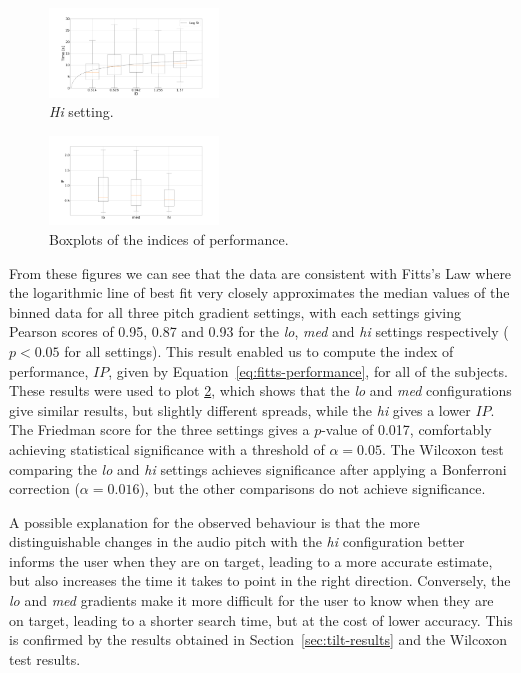 \documentclass[sigconf, review=true, screen=true, anonymous=true]{acmart}
\begin{document}
\begin{figure}
  \centering
  \includegraphics[clip, trim=120 20 120 20, width=0.4\textwidth]{figures/fitts_hi.png}
  \caption{\emph{Hi} setting. }
  \label{fig:fitts-hi}
\end{figure}

\begin{figure}
  \centering
  \includegraphics[clip, trim=90 20 130 20, width=0.4\textwidth]{figures/fitts_performance.png}
  \caption{Boxplots of the indices of performance.}
  \label{fig:fitts-performance}
\end{figure}

From these figures we can see that the data are consistent with Fitts's Law where the logarithmic line of best fit very closely approximates the median values of the binned data for all three pitch gradient settings, with each settings giving Pearson scores of 0.95, 0.87 and 0.93 for the \emph{lo}, \emph{med} and \emph{hi} settings respectively ($p < 0.05$ for all settings). 
This result enabled us to compute the index of performance, $IP$, given by Equation~\ref{eq:fitts-performance}, for all of the subjects.
These results were used to plot \cref{fig:fitts-performance}, which shows that the \emph{lo} and \emph{med} configurations give similar results, but slightly different spreads, while the \emph{hi} gives a lower $IP$.
The Friedman score for the three settings gives a $p$-value of 0.017, comfortably achieving statistical significance with a threshold of $\alpha=0.05$.
The Wilcoxon test comparing the \emph{lo} and \emph{hi} settings achieves significance after applying a Bonferroni correction ($\alpha=0.016$), but the other comparisons do not achieve significance. 

A possible explanation for the observed behaviour is that the more distinguishable changes in the audio pitch with the \emph{hi} configuration better informs the user when they are on target, leading to a more accurate estimate, but also increases the time it takes to point in the right direction.
Conversely, the \emph{lo} and \emph{med} gradients make it more difficult for the user to know when they are on target, leading to a shorter search time, but at the cost of lower accuracy.
This is confirmed by the results obtained in Section~\ref{sec:tilt-results} and the Wilcoxon test results. 
\end{document}
